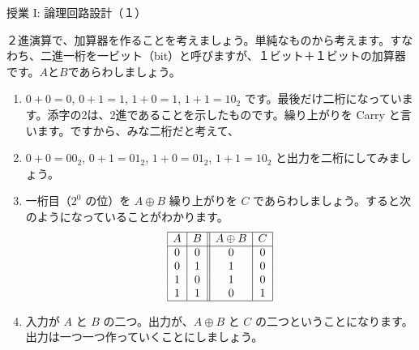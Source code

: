 \documentclass[10pt, dvipdfmx]{beamer}
\begin{document}
\begin{frame}{授業 I: 論理回路設計（１）}

２進演算で、加算器を作ることを考えましょう。単純なものから考えます。すなわち、二進一桁を一ビット（bit）と呼びますが、１ビット＋１ビットの加算器です。\(A\)と\(B\)であらわしましょう。
 
\begin{enumerate}
\item \(0+0=0\), \(0+1=1\), \(1+0=1\), \(1+1 = 10_2\) です。最後だけ二桁になっています。添字の2は、2進であることを示したものです。繰り上がりを Carry と言います。ですから、みな二桁だと考えて、
\item \(0+0=00_2\), \(0+1=01_2\), \(1+0=01_2\), \(1+1 = 10_2\) と出力を二桁にしてみましょう。
\item 一桁目（\(2^0\) の位）を \(A\oplus B\) 繰り上がりを \(C\) であらわしましょう。すると次のようになっていることがわかります。
\[ \begin{array}{|c|c||c|c|} \hline A  & B  & A\oplus B  & C \\ \hline 0  & 0  & 0  & 0 \\ 0  & 1  & 1  & 0 \\ 1  & 0  & 1  & 0 \\ 1  & 1  & 0  & 1\\ \hline \end{array} \]

\item 入力が \(A\) と \(B\) の二つ。出力が、\(A\oplus B\) と \(C\) の二つということになります。出力は一つ一つ作っていくことにしましょう。
\end{enumerate}
\end{frame}
\end{document}
